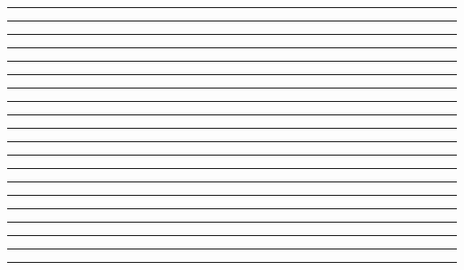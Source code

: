 \documentclass[11pt]{article}
\begin{document}
\par\nointerlineskip\noindent\hspace*{5.6mm}\rule{.4pt}{1.2mm}\hspace{1.2pt}\rule{.4pt}{1.2mm}\hspace{1.5mm}\hspace{19.93mm}\hspace{1.5mm}\rule{.4pt}{1.2mm}\hspace{1.5mm}\hspace{15.63mm}\hspace{1.5mm}\rule{.4pt}{1.2mm}\hspace{1.5mm}\hspace{16.01mm}\hspace{1.5mm}\rule{.4pt}{1.2mm}\hspace{1.2pt}\rule{.4pt}{1.2mm}\hspace{1.5mm}\hspace{16.01mm}\hspace{1.5mm}\rule{.4pt}{1.2mm}\hspace{1.5mm}\hspace{16.16mm}\hspace{1.5mm}\rule{.4pt}{1.2mm}\hspace{1.2pt}\rule{.4pt}{1.2mm}\hspace{1.5mm}\hspace{15.66mm}\hspace{1.5mm}\rule{.4pt}{1.2mm}\hspace{1.5mm}\hspace{16.16mm}\hspace{1.5mm}\rule{.4pt}{1.2mm}\hspace{1.2pt}\rule{.4pt}{1.2mm}\par\nointerlineskip
\par\nointerlineskip\noindent\hspace*{5.60mm}\rule{139.93mm}{1.2pt}\par\nointerlineskip
\par\nointerlineskip\noindent\hspace*{5.6mm}\rule{.4pt}{0.60mm}\hspace{1.2pt}\rule{.4pt}{0.60mm}\hspace{1.5mm}\hspace{19.93mm}\hspace{1.5mm}\rule{.4pt}{0.60mm}\hspace{1.5mm}\hspace{54.53mm}\hspace{1.5mm}\rule{.4pt}{0.60mm}\hspace{1.2pt}\rule{.4pt}{0.60mm}\hspace{1.5mm}\hspace{54.21mm}\hspace{1.5mm}\rule{.4pt}{0.60mm}\hspace{1.2pt}\rule{.4pt}{0.60mm}\par\nointerlineskip
\end{document}
